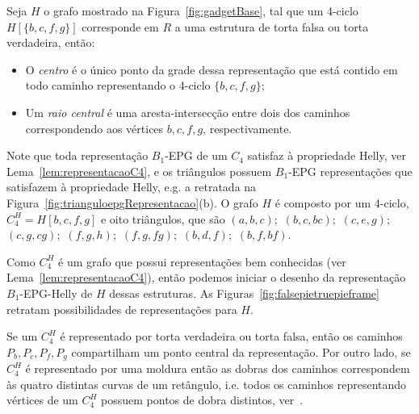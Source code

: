 
\begin{definition}
Seja $H$ o grafo mostrado na  Figura~\ref{fig:gadgetBase}, tal que um 4-ciclo $H[\{b, c, f, g \}]$ corresponde em $R$ a uma estrutura de torta falsa ou torta verdadeira, então:

\begin{itemize}
\item O \emph{centro} é o único ponto da grade dessa representação que está contido em todo caminho representando o 4-ciclo $ \{b, c, f, g \}$; \label{lab:lab1}

\item Um \emph {raio central} é uma aresta-intersecção entre dois dos caminhos correspondendo aos vértices $ b, c, f, g$, respectivamente.
\end{itemize}
\end{definition}


Note que toda representação $B_1$-EPG de um $C_4$ satisfaz à propriedade Helly, ver Lema~\ref{lem:representacaoC4}, e os triângulos possuem $B_1$-EPG representações que satisfazem à propriedade Helly, e.g. a retratada na Figura~\ref{fig:trianguloepgRepresentacao}(b). O grafo $H$ é composto por um 4-ciclo,  $C_4^{H}=H[b, c, f, g]$ e oito triângulos, que são $(a,b,c);$ $(b,c,bc);$ $(c,e,g);$ $(c,g,cg);$ $(f,g,h);$ $(f,g,fg);$ $(b,d,f);$ $(b,f,bf).$

Como $C_4^{H}$ é um grafo que possui representações bem conhecidas (ver Lema~\ref{lem:representacaoC4}), então podemos iniciar o desenho da representação $B_{1}$-EPG-Helly de $H$ dessas estruturas. As  Figuras~\ref{fig:falsepietruepieframe} retratam possibilidades de representações para $H$.

Se um $C_4^{H}$ é representado por torta verdadeira ou torta falsa, então os caminhos $P_b, P_c, P_f, P_g$ compartilham um ponto central da representação. Por outro lado, se  $C_4^{H}$ é representado por uma moldura então as dobras dos caminhos correspondem às quatro distintas curvas de um retângulo, i.e. todos os caminhos representando  vértices de um $C_4^{H}$ possuem pontos de dobra distintos, ver~\cite{golumbic2009}.

